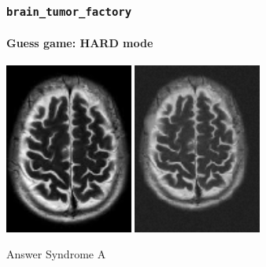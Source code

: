 \documentclass[]{beamer}
\newcommand{\btf}{\tt{brain\_tumor\_factory}}
\begin{document}
\begin{frame}
  \frametitle{\btf}
  \framesubtitle{Guess game: HARD mode}
  \begin{minipage}{\linewidth}
    \begin{center}
      \includegraphics[width=4.2cm]{resources/brain_base}
      \includegraphics[width=4.2cm]{resources/a2}
    \end{center}
  \end{minipage}
  \pause
  \begin{block}{Answer}
    Syndrome A
  \end{block}
\end{frame}
\end{document}
